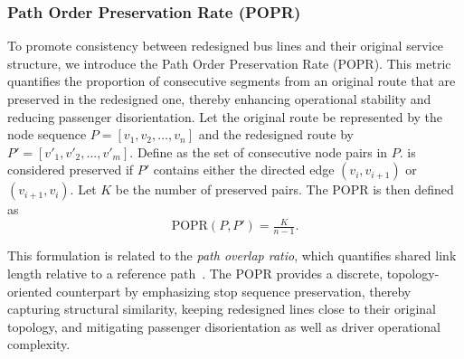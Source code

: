 \documentclass[3p,times,procedia]{elsarticle}
\begin{document}
\subsubsection{Path Order Preservation Rate (POPR)}\label{subsec:porp}
To promote consistency between redesigned bus lines and their original service structure, we introduce the Path Order Preservation Rate (POPR). This metric quantifies the proportion of consecutive segments from an original route that are preserved in the redesigned one, thereby enhancing operational stability and reducing passenger disorientation.
%
Let the original route be represented by the node sequence $P = [v_1, v_2, \dots, v_n]$ and the redesigned route by $P' = [v'_1, v'_2, \dots, v'_m]$. Define  as the set of consecutive node pairs in $P$.  is considered preserved if $P'$ contains either the directed edge $(v_i,v_{i+1})$ or $(v_{i+1},v_i)$.  Let $K$ be the number of preserved pairs. The POPR is then defined as
\begin{equation}
    \text{POPR}(P,P') = \tfrac{K}{n-1}.
\end{equation}

This formulation is related to the \emph{path overlap ratio}, which quantifies shared link length relative to a reference path~\citep{Lim2005PathOverlap}. The POPR provides a discrete, topology-oriented counterpart by emphasizing stop sequence preservation, thereby capturing structural similarity, keeping redesigned lines close to their original topology, and mitigating passenger disorientation as well as driver operational complexity.
\end{document}
